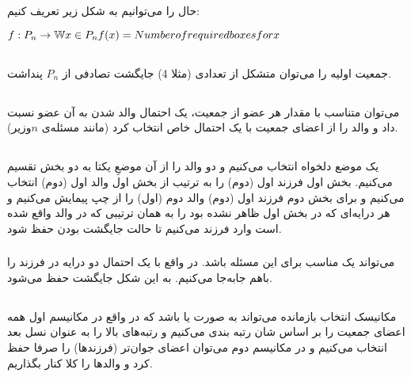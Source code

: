 \documentclass{article}
\begin{document}
\subsection{}
حال  را می‌توانیم به شکل زیر تعریف کنیم:
\begin{latin}
$
\newline
f: P_{n} \to \mathbb{W}
\newline
x \in P_{n}
\newline
f(x) = Number \space of \space required \space boxes \space for \space x
$
\end{latin}


\subsection{}
جمعیت اولیه را می‌توان متشکل از تعدادی (مثلا 4) جایگشت تصادفی از $P_{n}$ پنداشت.
\subsection{}
می‌توان متناسب با مقدار  هر عضو از جمعیت، یک احتمال والد شدن به آن عضو نسبت داد و والد را از اعضای جمعیت با یک احتمال خاص انتخاب کرد (مانند مسئله‌ی $n$وزیر).
\subsection{}
\subsubsection{}
یک موضع دلخواه انتخاب می‌کنیم و دو والد را از آن موضعِ یکتا به دو بخش تقسیم می‌کنیم. بخش اول فرزند اول (دوم) را به ترتیب از بخش اول والد اول (دوم) انتخاب می‌کنیم و برای بخش دوم فرزند اول (دوم) والد دوم (اول) را از چپ پیمایش می‌کنیم و هر درایه‌ای که در بخش اول ظاهر نشده بود را به همان ترتیبی که در والد واقع شده است وارد فرزند می‌کنیم تا حالت جایگشت بودن حفظ شود.
\subsubsection{}
 می‌تواند یک  مناسب برای این مسئله باشد. در واقع با یک احتمال دو درایه در فرزند را باهم جابه‌جا می‌کنیم. به این شکل جایگشت حفظ می‌شود.
\subsection{}
مکانیسک انتخاب بازمانده می‌تواند به صورت  یا  باشد که در واقع در مکانیسم اول همه اعضای جمعیت را بر اساس شان رتبه بندی می‌کنیم و رتبه‌های بالا را به عنوان نسل بعد انتخاب می‌کنیم و در مکانیسم دوم می‌توان اعضای جوان‌تر (فرزندها) را صرفا حفظ کرد و والدها را کلا کنار بگذاریم.
\end{document}
